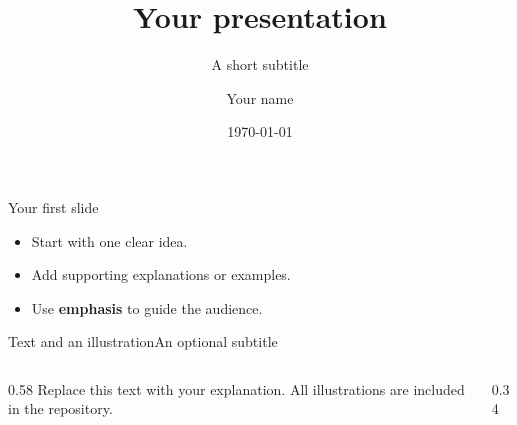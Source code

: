 \documentclass[aspectratio=169]{beamer}
\title{Your presentation}
\subtitle{A short subtitle}
\author{Your name}
\institute{Your institute}
\date{\today}
\begin{document}
\begin{frame}
  \titlepage
\end{frame}

\begin{frame}{Your first slide}
  \begin{itemize}
    \item Start with one clear idea.
    \item Add supporting explanations or examples.
    \item Use \textbf{emphasis} to guide the audience.
  \end{itemize}
\end{frame}

\begin{frame}{Text and an illustration}{An optional subtitle}
  \begin{columns}[c]
    \begin{column}{0.58\textwidth}
      Replace this text with your explanation.
      All illustrations are included in the repository.
    \end{column}
    \begin{column}{0.34\textwidth}
      \centering
      \alice[height=2.4cm]
    \end{column}
  \end{columns}
\end{frame}

\closingframe
\end{document}
